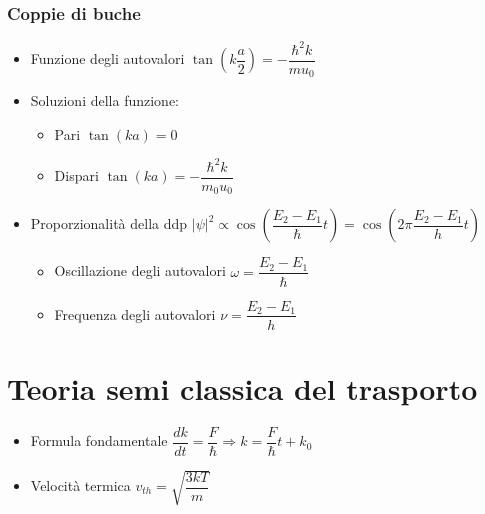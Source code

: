 \documentclass{article}
\begin{document}
\newpage

\subsubsection{Coppie di buche}
\begin{itemize}
  \item Funzione degli autovalori \( \tan\left( k \dfrac{a}{2} \right) = - \dfrac{\hbar ^2 k}{m u_0} \)
  \item Soluzioni della funzione:
        \begin{itemize}
          \item Pari \( \tan \left( ka \right) = 0 \)
          \item Dispari \( \tan \left( ka \right) = - \dfrac{\hbar ^ 2 k}{m_0 u_0}  \)
        \end{itemize}
  \item Proporzionalità della ddp \( \left| \psi \right| ^ 2 \propto \cos \left( \dfrac{E_2 - E_1}{\hbar} t \right) = \cos \left( 2 \pi \dfrac{E_2 - E_1}{h} t \right)  \)
        \begin{itemize}
          \item Oscillazione degli autovalori \( \omega = \dfrac{E_2 - E_1}{\hbar} \)
          \item Frequenza degli autovalori \( \nu = \dfrac{E_2 - E_1}{h} \)
        \end{itemize}
\end{itemize}

\section{Teoria semi classica del trasporto}
\begin{itemize}
  \item Formula fondamentale \( \dfrac{dk}{dt} = \dfrac{F}{\hbar} \Rightarrow k = \dfrac{F}{\hbar} t + k_0 \)
  \item Velocità termica \( \displaystyle v_{th} = \sqrt{\dfrac{3 k T}{m}} \)
\end{itemize}
\end{document}
